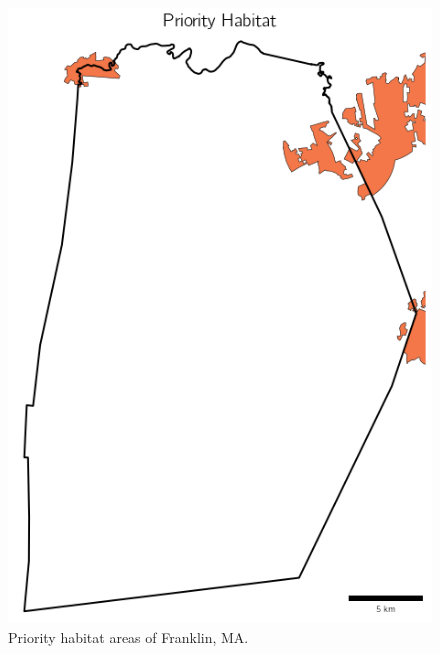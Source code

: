\documentclass[12pt, stu, floatsintext,table]{apa7}
\begin{document}
\begin{figure}[H]
    \centering
    \includegraphics[width=0.75\linewidth]{figures/prihab_cover.png}
    \caption{Priority habitat areas of Franklin, MA.  }
\end{figure}
\end{document}
